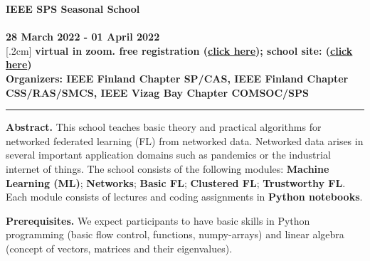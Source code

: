 \documentclass[12pt,epsf]{article}
\begin{document}
	\vspace*{10mm}

\begin{framed}
\begin{center}
\Large{\bf IEEE SPS Seasonal School}\\[.3cm]
		\\[.4cm]
\large{\bf 28 March 2022 - 01 April 2022}\\ 
[.2cm]
{\bf virtual in zoom. free registration (\href{https://events.vtools.ieee.org/event/register/297208}{click here}); school site: (\href{https://ieeespcasfinland.github.io/}{click here})} \\[3mm]
{\bf Organizers: IEEE Finland Chapter SP/CAS, IEEE Finland Chapter CSS/RAS/SMCS, IEEE Vizag Bay Chapter COMSOC/SPS  }
\rule{10cm}{.3mm} \vspace*{-0cm}
\end{center}

\renewcommand{\baselinestretch}{.95}\small\normalsize
\vspace*{-4mm}
\large

{\bf Abstract.}
This school teaches basic theory and practical algorithms for networked federated learning (FL) from networked data. Networked data arises in several important application domains such as pandemics or the industrial internet of things. The school consists of the following modules: {\bf Machine Learning (ML)}; {\bf Networks}; {\bf Basic FL}; {\bf Clustered FL}; {\bf Trustworthy FL}. Each module consists of lectures and coding assignments in {\bf Python notebooks}.  

\vspace*{2mm}
{\bf Prerequisites.} We expect participants to have basic skills in Python programming (basic flow control, functions, numpy-arrays) and linear algebra (concept of vectors, matrices and their eigenvalues). 


\end{framed}
\end{document}
